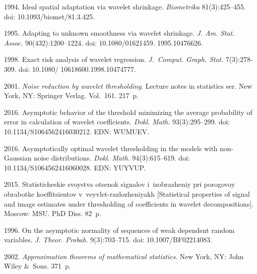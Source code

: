 \begin{multicols}{2}
{{\begin{thebibliography}{99}
 1994. 
Ideal spatial adaptation via wavelet shrinkage. 
\textit{Biometrika} 81(3):425--455. doi: 10.1093/biomet/81.3.425.

 1995. 
Adapting to unknown smoothness via wavelet shrinkage. 
\textit{J. Am. Stat. Assoc.} 90(432):1200--1224. doi: 10.1080/01621459. 1995.10476626.

 1998. 
Exact risk analysis of wavelet regression. 
\textit{J.~Comput. Graph. Stat.} 7(3):278-309. doi: 10.1080/ 10618600.1998.10474777.

 2001. 
\textit{Noise reduction by wavelet thresholding}. Lecture notes in statistics ser. New York, NY: Springer Verlag. Vol.~161. 217~p.

 2016. 
Asymptotic behavior of the threshold minimizing the average probability of error in calculation of wavelet coefficients. 
\textit{Dokl. Math.} 93(3):295--299.
doi: 10.1134/S1064562416030212. EDN: WUMUEV. 

 2016. 
Asymptotically optimal wavelet thresholding in the models with non-Gaussian noise distributions. 
\textit{Dokl. Math.} 94(3):615--619.
doi: 10.1134/S1064562416060028. EDN: YUYVUP.




 2015. Statisticheskie svoystva otsenok signalov i~izobrazheniy pri porogovoy obrabotke ko\-ef\-fi\-tsi\-en\-tov 
v~veyvlet-razlozheniyakh 
[Statistical properties of signal and image estimates under thresholding of coefficients in wavelet decompositions]. Moscow: MSU. PhD Diss. 82~p.

 1996. 
On the asymptotic normality of sequences of weak dependent random variables. 
\textit{J. Theor. Probab.} 9(3):703--715. doi: 10.1007/BF02214083.

 2002. 
\textit{Approximation theorems of mathematical statistics}. New York, NY: John Wiley \&~Sons. 371~p.
\end{thebibliography}

 }
 }

\end{multicols}

